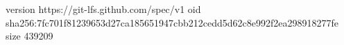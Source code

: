 version https://git-lfs.github.com/spec/v1
oid sha256:7fc701f81239653d27ca185651947cbb212cedd5d62c8e992f2ea298918277fe
size 439209
